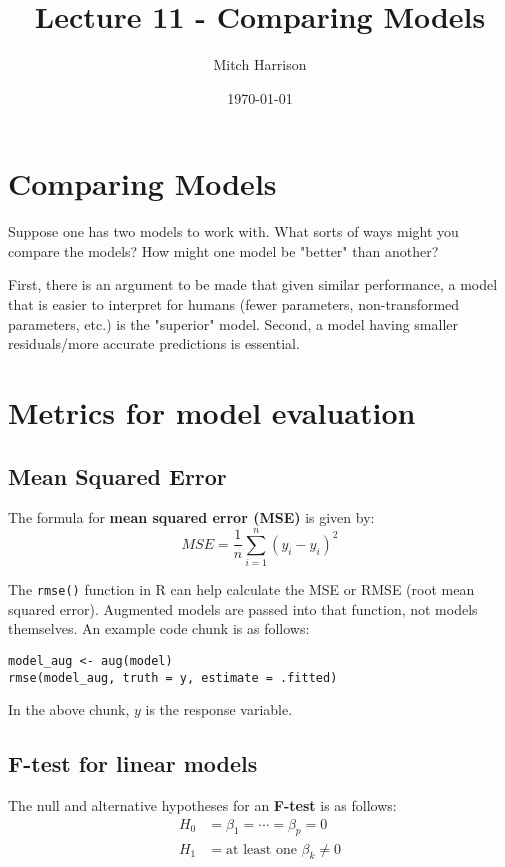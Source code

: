 \documentclass[titlepage, 12pt, leqno]{article}
\title{\Huge{Lecture 11 - Comparing Models}}
\author{\large{Mitch Harrison}}
\date{\today}
\begin{document}
\setlength{\parskip}{1\baselineskip}
\setlength{\parindent}{15pt}
\maketitle
\tableofcontents
\newpage


\section{Comparing Models}

Suppose one has two models to work with. What sorts of ways might you compare the 
models? How might one model be "better" than another?

First, there is an argument to be made that given similar performance, a model
that is easier to interpret for humans (fewer parameters, non-transformed 
parameters, etc.) is the "superior" model. Second, a model having smaller 
residuals/more accurate predictions is essential. 

\pagebreak
\section{Metrics for model evaluation}
\subsection{Mean Squared Error}
\begin{definition}
    The formula for \textbf{mean squared error (MSE)} is given by:
    \[
        MSE = \frac{1}{n}\sum_{i=1}^{n}(y_i-\hat y_i)^2
    \]
\end{definition}

The \texttt{rmse()} function in R can help calculate the MSE or RMSE (root
mean squared error). Augmented models are passed into that function, not
models themselves. An example code chunk is as follows:
\begin{verbatim}
model_aug <- aug(model)
rmse(model_aug, truth = y, estimate = .fitted)
\end{verbatim}

\begin{note}
    In the above chunk, $y$ is the response variable.
\end{note}

\subsection{F-test for linear models}
The null and alternative hypotheses for an \textbf{F-test} is as follows:
\begin{align*}
    H_0 &= \beta_1 = \cdots = \beta_p = 0\\
    H_1 &= \text{at least one }\beta_k \ne 0
\end{align*}
\end{document}
